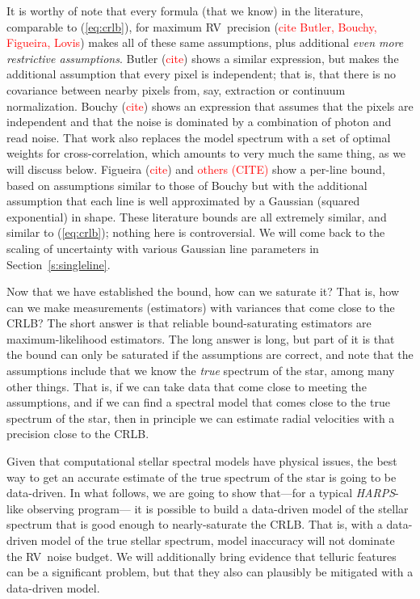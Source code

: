 \documentclass[modern]{aastex631}
\newcommand{\sectionname}{Section}
\newcommand{\todo}[1]{\textcolor{red}{#1}}  %
\newcommand{\CITE}{\todo{CITE}}
\newcommand{\acronym}[1]{{\small{#1}}}
\newcommand{\project}[1]{\textsl{#1}}
\newcommand{\HARPS}{\project{\acronym{HARPS}}}
\newcommand{\RV}{\acronym{RV}}
\newcommand{\CRLB}{\acronym{CRLB}}
\begin{document}
It is worthy of note that every formula (that we know) in the
literature, comparable to (\ref{eq:crlb}), for maximum \RV\ precision (\todo{cite Butler, Bouchy,
  Figueira, Lovis}) makes all of these same assumptions,
plus additional \emph{even more restrictive assumptions}.
Butler (\todo{cite}) shows a similar expression, but makes the additional
assumption that every pixel is independent; that is, that there is no
covariance between nearby pixels from, say, extraction or continuum normalization.
Bouchy (\todo{cite}) shows an expression that assumes that the pixels
are independent and that the noise is dominated by a combination of photon
and read noise. 
That work also replaces the model spectrum with a set of optimal
weights for cross-correlation, which amounts to very much the same thing,
as we will discuss below.
Figueira (\todo{cite}) and \todo{others (\CITE)} show a per-line
bound, based on assumptions similar to those of Bouchy but with the additional assumption that
each line is well approximated by a Gaussian (squared exponential) in shape.
These literature bounds are all extremely similar, and similar to (\ref{eq:crlb});
nothing here is controversial.
We will come back to the scaling of uncertainty with various
Gaussian line parameters in \sectionname~\ref{s:singleline}.

Now that we have established the bound, how can we saturate it? That is,
how can we make measurements (estimators) with variances that come close to the \CRLB?
The short answer is that reliable bound-saturating estimators are maximum-likelihood estimators.
The long answer is long, but part of it is that the bound can only be saturated if the
assumptions are correct, and note that the assumptions include that we know the
\emph{true} spectrum of the star, among many other things.
That is, if we can take data that come close to meeting the assumptions, and
if we can find a spectral model that comes close to the true spectrum of the star,
then in principle we can estimate radial velocities with a precision close to the \CRLB.

Given that computational stellar spectral models have physical issues, the best way
to get an accurate estimate of the true spectrum of the star is going to be data-driven.
In what follows, we are going to show that---for a typical \HARPS-like observing program---%
it is possible to build a data-driven model of the stellar spectrum that is good enough
to nearly-saturate the \CRLB.
That is, with a data-driven model of the true stellar spectrum, model inaccuracy will
not dominate the \RV\ noise budget.
We will additionally bring evidence that telluric features can be a significant problem,
but that they also can plausibly be mitigated with a data-driven model.
\end{document}
